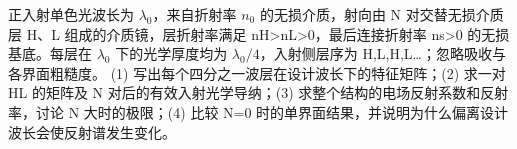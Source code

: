 正入射单色光波长为 \(\lambda _{0}\)，来自折射率 \(n_{0}\) 的无损介质，射向由 N 对交替无损介质层 H、L 组成的介质镜，层折射率满足 nH>nL>0，最后连接折射率 ns>0 的无损基底。每层在 \(\lambda _{0}\) 下的光学厚度均为 \(\lambda _{0}/4\)，入射侧层序为 H,L,H,L…；忽略吸收与各界面粗糙度。
(1) 写出每个四分之一波层在设计波长下的特征矩阵；(2) 求一对 HL 的矩阵及 N 对后的有效入射光学导纳；(3) 求整个结构的电场反射系数和反射率，讨论 N 大时的极限；(4) 比较 N=0 时的单界面结果，并说明为什么偏离设计波长会使反射谱发生变化。
